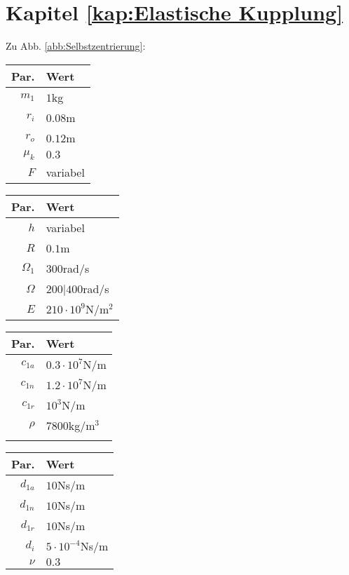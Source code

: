\section{Kapitel \ref{kap:Elastische Kupplung}}
Zu Abb. \ref{abb:Selbstzentrierung}:  
\begin{center}
	\begin{tabular}{r|l}
		Par.&Wert\\\hline
		$m_1$&$1$kg\\
		$r_i$&$0.08$m\\
		$r_o$&$0.12$m\\
		$\mu_k$& $0.3$\\
		$F$&variabel\\
	\end{tabular}\hfill
	\begin{tabular}{r|l}
		Par.&Wert\\\hline
		$h$&variabel\\
		$R$&$0.1$m\\
		$\Omega_1$&$300$rad/s\\
		$\Omega$& $200|400$rad/s\\
		$E$&$210\cdot10^9$N/m$^2$\\
	\end{tabular}\hfill
	\begin{tabular}{r|l}
		Par.&Wert\\\hline
		$c_{1a}$&$0.3\cdot10^{7}$N/m\\
		$c_{1n}$&$1.2\cdot10^{7}$N/m\\
		$c_{1r}$&$10^{3}$N/m\\
		$\rho$&$7800$kg/m$^3$\\
		&
	\end{tabular}\hfill
	\begin{tabular}{r|l}
		Par.&Wert\\\hline
		$d_{1a}$&$10$Ns/m\\
		$d_{1n}$&$10$Ns/m\\
		$d_{1r}$&$10$Ns/m\\
		$d_i$ &$5\cdot10^{-4}$Ns/m\\
		$\nu$&$0.3$\\
	\end{tabular}
\end{center}


